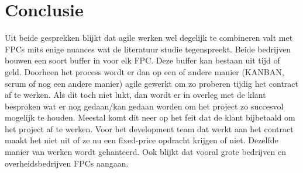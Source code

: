 \documentclass{hogent-article}
\begin{document}
	
	\section{Conclusie}
	Uit beide gesprekken blijkt dat agile werken wel degelijk te combineren valt met FPCs mits enige nuances wat de literatuur studie tegenspreekt. Beide bedrijven bouwen een soort buffer in voor elk FPC. Deze buffer kan bestaan uit tijd of geld. Doorheen het process wordt er dan op een of andere manier (KANBAN, scrum of nog een andere manier) agile gewerkt om zo proberen tijdig het contract af te werken. Als dit toch niet lukt, dan wordt er in overleg met de klant besproken wat er nog gedaan/kan gedaan worden om het project zo succesvol mogelijk te houden. Meestal komt dit neer op het feit dat de klant bijbetaald om het project af te werken. Voor het development team dat werkt aan het contract maakt het niet uit of ze nu een fixed-price opdracht krijgen of niet. Dezelfde manier van werken wordt gehanteerd. Ook blijkt dat vooral grote bedrijven en overheidsbedrijven FPCs aangaan.

	
	
	\printbibliography[heading=bibintoc]
	
\end{document}
